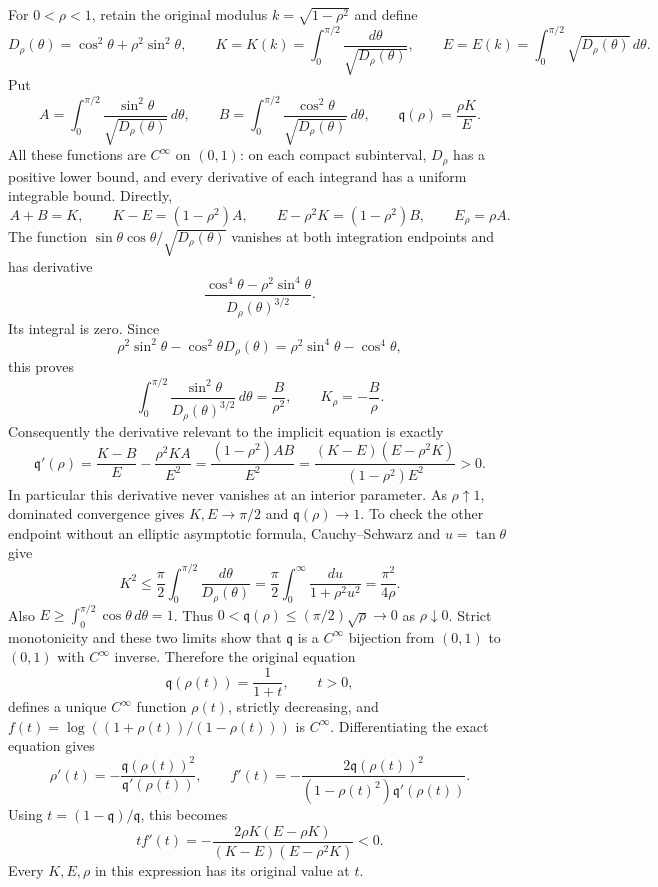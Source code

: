 For $0<\rho<1$, retain the original modulus
$k=\sqrt{1-\rho^2}$ and define
\[
 D_\rho(\theta)=\cos^2\theta+\rho^2\sin^2\theta,
 \qquad
 K=K(k)=\int_0^{\pi/2}\frac{d\theta}{\sqrt{D_\rho(\theta)}},
 \qquad
 E=E(k)=\int_0^{\pi/2}\sqrt{D_\rho(\theta)}\,d\theta.
\]
Put
\[
 A=\int_0^{\pi/2}\frac{\sin^2\theta}{\sqrt{D_\rho(\theta)}}\,d\theta,
 \qquad
 B=\int_0^{\pi/2}\frac{\cos^2\theta}{\sqrt{D_\rho(\theta)}}\,d\theta,
 \qquad \mathfrak q(\rho)=\frac{\rho K}{E}.
\]
All these functions are $C^\infty$ on $(0,1)$: on each compact
subinterval, $D_\rho$ has a positive lower bound, and every derivative
of each integrand has a uniform integrable bound. Directly,
\[
 A+B=K,\qquad K-E=(1-\rho^2)A,
 \qquad E-\rho^2K=(1-\rho^2)B,
 \qquad E_\rho=\rho A.
\]
The function $\sin\theta\cos\theta/\sqrt{D_\rho(\theta)}$
vanishes at both integration endpoints and has derivative
\[
 \frac{\cos^4\theta-\rho^2\sin^4\theta}
 {D_\rho(\theta)^{3/2}}.
\]
Its integral is zero. Since
\[
 \rho^2\sin^2\theta-\cos^2\theta D_\rho(\theta)
 =\rho^2\sin^4\theta-\cos^4\theta,
\]
this proves
\[
 \int_0^{\pi/2}\frac{\sin^2\theta}{D_\rho(\theta)^{3/2}}\,d\theta
 =\frac B{\rho^2},\qquad K_\rho=-\frac B\rho.
\]
Consequently the derivative relevant to the implicit equation is exactly
\[
 \boxed{
 \mathfrak q'(\rho)=\frac{K-B}{E}-\frac{\rho^2KA}{E^2}
 =\frac{(1-\rho^2)AB}{E^2}
 =\frac{(K-E)(E-\rho^2K)}{(1-\rho^2)E^2}>0.}
\]
In particular this derivative never vanishes at an interior parameter.
As $\rho\uparrow1$, dominated convergence gives $K,E\to\pi/2$
and $\mathfrak q(\rho)\to1$. To check the other endpoint without an elliptic
asymptotic formula, Cauchy--Schwarz and $u=\tan\theta$ give
\[
 K^2\le\frac\pi2\int_0^{\pi/2}\frac{d\theta}{D_\rho(\theta)}
 =\frac\pi2\int_0^\infty\frac{du}{1+\rho^2u^2}
 =\frac{\pi^2}{4\rho}.
\]
Also $E\ge\int_0^{\pi/2}\cos\theta\,d\theta=1$.
Thus $0<\mathfrak q(\rho)\le(\pi/2)\sqrt\rho\to0$ as $\rho\downarrow0$.
Strict monotonicity and these two limits show that $\mathfrak q$ is a
$C^\infty$ bijection from $(0,1)$ to $(0,1)$ with $C^\infty$ inverse.
Therefore the original equation
\[
 \mathfrak q(\rho(t))=\frac1{1+t},\qquad t>0,
\]
defines a unique $C^\infty$ function $\rho(t)$, strictly decreasing,
and $f(t)=\log((1+\rho(t))/(1-\rho(t)))$ is $C^\infty$.
Differentiating the exact equation gives
\[
 \rho'(t)=-\frac{\mathfrak q(\rho(t))^2}{\mathfrak q'(\rho(t))},\qquad
 f'(t)=-\frac{2\mathfrak q(\rho(t))^2}{(1-\rho(t)^2)\mathfrak q'(\rho(t))}.
\]
Using $t=(1-\mathfrak q)/\mathfrak q$, this becomes
\[
 \boxed{
 t f'(t)=-\frac{2\rho K(E-\rho K)}{(K-E)(E-\rho^2K)}<0.}
\]
Every $K,E,\rho$ in this expression has its original value at $t$.

